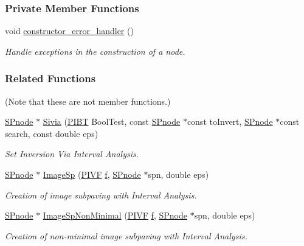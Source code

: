 \subsubsection*{\-Private \-Member \-Functions}
\begin{DoxyCompactItemize}
\item 
void \hyperlink{classsubpavings_1_1SPnode_a75618e8e46f82b309f744fc12927b2a9}{constructor\-\_\-error\-\_\-handler} ()
\begin{DoxyCompactList}\small\item\em \-Handle exceptions in the construction of a node. \end{DoxyCompactList}\end{DoxyCompactItemize}
\subsubsection*{\-Related \-Functions}
(\-Note that these are not member functions.) \begin{DoxyCompactItemize}
\item 
\hyperlink{classsubpavings_1_1SPnode}{\-S\-Pnode} $\ast$ \hyperlink{classsubpavings_1_1SPnode_ace7e46329dbdb96110f7f24bba46ee93}{\-Sivia} (\hyperlink{namespacesubpavings_a4ca48fac31a3dcc26d5b51b1ee3cd0d9}{\-P\-I\-B\-T} \-Bool\-Test, const \hyperlink{classsubpavings_1_1SPnode}{\-S\-Pnode} $\ast$const to\-Invert, \hyperlink{classsubpavings_1_1SPnode}{\-S\-Pnode} $\ast$const search, const double eps)
\begin{DoxyCompactList}\small\item\em \-Set \-Inversion \-Via \-Interval \-Analysis. \end{DoxyCompactList}\item 
\hyperlink{classsubpavings_1_1SPnode}{\-S\-Pnode} $\ast$ \hyperlink{classsubpavings_1_1SPnode_a5e79ff65a692b09c98ff53264ddfba9f}{\-Image\-Sp} (\hyperlink{namespacesubpavings_af9ec133810ddce70b48381d444e2ec22}{\-P\-I\-V\-F} \hyperlink{errorfunc_8hpp_aacb77b1211a6ca2e2beff1811cf9ecf4}{f}, \hyperlink{classsubpavings_1_1SPnode}{\-S\-Pnode} $\ast$spn, double eps)
\begin{DoxyCompactList}\small\item\em \-Creation of image subpaving with \-Interval \-Analysis. \end{DoxyCompactList}\item 
\hyperlink{classsubpavings_1_1SPnode}{\-S\-Pnode} $\ast$ \hyperlink{classsubpavings_1_1SPnode_adda5afc72873dc3875f341ecbb947b23}{\-Image\-Sp\-Non\-Minimal} (\hyperlink{namespacesubpavings_af9ec133810ddce70b48381d444e2ec22}{\-P\-I\-V\-F} \hyperlink{errorfunc_8hpp_aacb77b1211a6ca2e2beff1811cf9ecf4}{f}, \hyperlink{classsubpavings_1_1SPnode}{\-S\-Pnode} $\ast$spn, double eps)
\begin{DoxyCompactList}\small\item\em \-Creation of non-\/minimal image subpaving with \-Interval \-Analysis. \end{DoxyCompactList}\end{DoxyCompactItemize}


